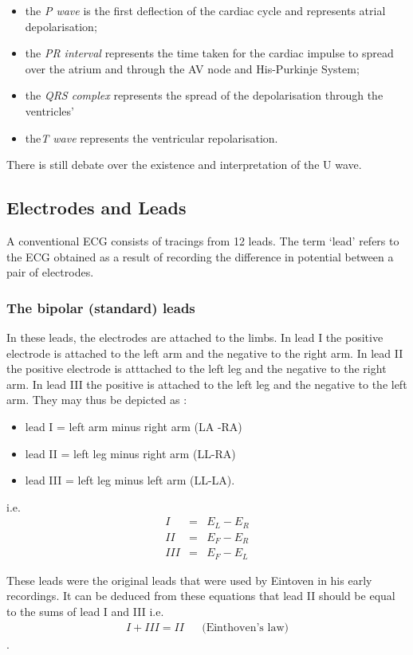 \begin{itemize}
\item the \emph{P wave} is the first deflection of the cardiac cycle and
  represents atrial depolarisation;
\item the \emph{PR interval} represents the time taken for the cardiac impulse
  to spread over the atrium and through the AV node and His-Purkinje System;
\item the \emph{QRS complex} represents the spread of the depolarisation
  through the ventricles'
\item the\emph{T wave} represents the ventricular repolarisation.
\end{itemize}

There is still debate over the existence and interpretation of the U wave.

\subsection{Electrodes and Leads}
A conventional ECG consists of tracings from 12 leads. The
term `lead' refers to the ECG obtained as a result of recording the
difference in potential between a pair of electrodes.

\subsubsection{The bipolar (standard) leads} 
In these leads, the electrodes are
attached to the limbs. In lead I the positive electrode is attached to the
left arm  and the negative to the right arm. In lead II the positive
electrode is atttached to the left leg and the negative to the right arm.  In
lead III the positive is attached to the left leg and the negative to the
left arm. They may thus be depicted as :
\begin{itemize}
\item lead I = left arm minus right arm (LA -RA)
\item lead II = left leg minus right arm (LL-RA)
\item lead III = left leg minus left arm (LL-LA).
\end{itemize}
i.e.
\begin{eqnarray*}
  I & = & E_{L} - E_{R}\\
  II & = & E_{F} - E_{R}\\
  III & = & E_{F} - E_{L}
\end{eqnarray*}

These leads were the original leads that were used by Eintoven in his early
recordings. It can be deduced from these equations that lead II should be equal to the
sums of lead I and III i.e.
\begin{eqnarray*}
  I + III = II & & \mbox{(Einthoven's law)}
\end{eqnarray*}
.

